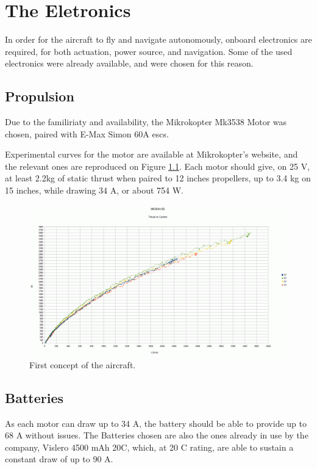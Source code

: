 
\chapter{The Eletronics} \label{chap:electronics}

In order for the aircraft to fly and navigate autonomously, onboard electronics are required, for both actuation, power source, and navigation. Some of the used electronics were already available, and were chosen for this reason.
	
\section{Propulsion}

Due to the familiriaty and availability, the Mikrokopter Mk3538 Motor was chosen, paired with E-Max Simon 60A escs.

Experimental curves for the motor are available at Mikrokopter's website, and the relevant ones are reproduced on Figure \ref{fig:motorcurves}. Each motor should give, on 25 V, at least 2.2kg of static thrust when paired to 12 inches propellers, up to 3.4 kg on 15 inches, while drawing 34 A, or about 754 W.
\begin{figure}[h]
\centering
  \includegraphics[width=\linewidth]{figs/motorcurves.png}
  \caption{First concept of the aircraft.}
  \label{fig:motorcurves}
\end{figure}


\section{Batteries}

As each motor can draw up to 34 A, the battery should be able to provide up to 68 A without issues.
The Batteries chosen are also the ones already in use by the company, Vislero 4500 mAh 20C, which, at 20 C rating, are able to sustain a constant draw of up to 90 A. 

